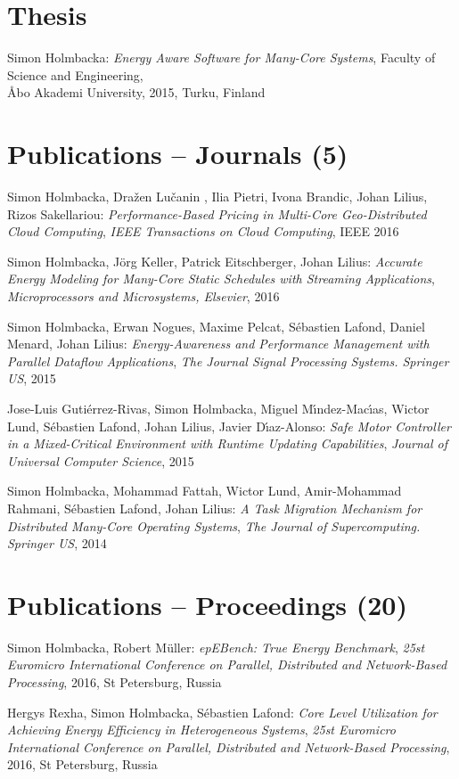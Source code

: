 \documentclass[margin,line]{resume}
\begin{document}
\begin{resume}
\section{\mysidestyle Thesis}    
Simon Holmbacka:
\textit{Energy Aware Software for Many-Core Systems},
Faculty of Science and Engineering,\\ \AA{}bo Akademi University, 2015, Turku, Finland

\section{\mysidestyle Publications -- Journals (5)}
Simon Holmbacka, Dra\v{z}en Lu\v{c}anin , Ilia Pietri, Ivona Brandic, Johan Lilius, Rizos Sakellariou:
\textit{Performance-Based Pricing in Multi-Core Geo-Distributed Cloud Computing}, 
\textsl{IEEE Transactions on Cloud Computing}, IEEE 2016

Simon Holmbacka, J\"{o}rg Keller, Patrick Eitschberger, Johan Lilius:
\textit{Accurate Energy Modeling for Many-Core Static Schedules with Streaming Applications}, 
\textsl{Microprocessors and Microsystems, Elsevier}, 2016

Simon Holmbacka, Erwan Nogues, Maxime Pelcat, S\'{e}bastien Lafond, Daniel Menard, Johan Lilius:
\textit{Energy-Awareness and Performance Management with Parallel Dataflow Applications}, 
\textsl{The Journal Signal Processing Systems. Springer US}, 2015

Jose-Luis Guti\'{e}rrez-Rivas, Simon Holmbacka, Miguel M\'{\i}ndez-Mac\'{\i}as, Wictor Lund, S\'{e}bastien Lafond, Johan Lilius, Javier D\'{\i}az-Alonso:
\textit{Safe Motor Controller in a Mixed-Critical Environment with Runtime Updating Capabilities}, 
\textsl{Journal of Universal Computer Science}, 2015

Simon Holmbacka, Mohammad Fattah, Wictor Lund, Amir-Mohammad Rahmani, S\'{e}bastien Lafond, Johan Lilius:
\textit{A Task Migration Mechanism for Distributed Many-Core Operating Systems}, 
\textsl{The Journal of Supercomputing. Springer US}, 2014 


\section{\mysidestyle Publications -- Proceedings (20)}
Simon Holmbacka, Robert M\"{u}ller: 
\textit{epEBench: True Energy Benchmark},
\textsl{25st Euromicro International Conference on Parallel, Distributed and Network-Based Processing}, 2016, St Petersburg, Russia

Hergys Rexha, Simon Holmbacka, S\'{e}bastien Lafond: 
\textit{Core Level Utilization for Achieving Energy Efficiency in Heterogeneous Systems},
\textsl{25st Euromicro International Conference on Parallel, Distributed and Network-Based Processing}, 2016, St Petersburg, Russia


\end{resume}
\end{document}
